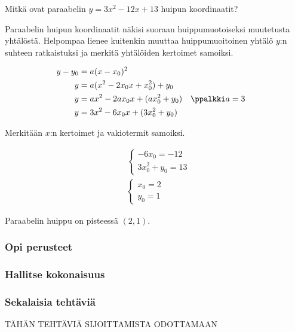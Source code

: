 \begin{esimerkki}
Mitkä ovat paraabelin $y=3x^2-12x+13$ huipun koordinaatit?
\begin{esimratk}
Paraabelin huipun koordinaatit näkisi suoraan huippumuotoiseksi muutetusta yhtälöstä. Helpompaa lienee kuitenkin muuttaa huippumuoitoinen yhtälö $y$:n suhteen ratkaistuksi ja merkitä yhtälöiden kertoimet samoiksi.

\begin{align*}
y-y_0 &= a(x-x_0)^2 \\
y       &= a(x^2-2x_0x+x_0^2)+y_0\\
y       &= ax^2-2ax_0x+(ax_0^2+y_0) &&\ppalkki a=3\\
y       &= 3x^2-6x_0x+(3x_0^2+y_0)
\end{align*}



Merkitään $x$:n kertoimet ja vakiotermit samoiksi.

\begin{align*}
&\begin{cases}
-6x_0=-12 \\
3x_0^2+y_0 =13
\end{cases}\\
&\begin{cases}
x_0=2 \\
y_0 =1
\end{cases}
\end{align*}

Paraabelin huippu on pisteessä $(2, 1)$.

\end{esimratk}
\end{esimerkki}



\begin{tehtavasivu}

\subsubsection*{Opi perusteet}

\subsubsection*{Hallitse kokonaisuus}

\subsubsection*{Sekalaisia tehtäviä}

TÄHÄN TEHTÄVIÄ SIJOITTAMISTA ODOTTAMAAN

\end{tehtavasivu}